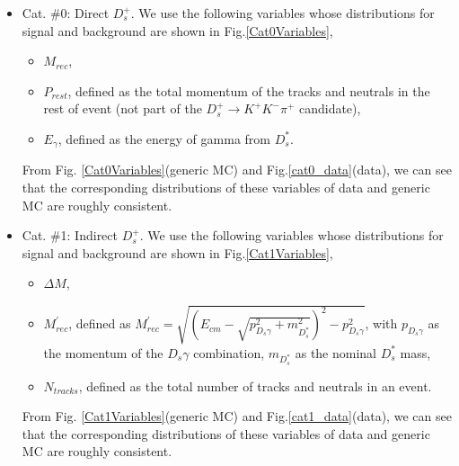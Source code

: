 \begin{itemize}
    \item Cat. \#0: Direct $D_{s}^{+}$. We use the following variables whose distributions for signal and background are shown in Fig.\ref{Cat0Variables},
        \begin{itemize}
            \item[1. ] $M_{rec}$,
            \item[2. ] $P_{rest}$, defined as the total momentum of the tracks and neutrals in the rest of event (not part of the $D_{s}^{+} \rightarrow K^{+}K^{-}\pi^{+}$ candidate),
            \item[3. ] $E_{\gamma}$, defined as the energy of gamma from $D_{s}^{*}$.
        \end{itemize}
        From Fig. \ref{Cat0Variables}(generic MC) and Fig.\ref{cat0_data}(data), we can see that the corresponding distributions of these variables of data and generic MC are roughly consistent.
        

    \item Cat. \#1: Indirect $D_{s}^{+}$.
        We use the following variables whose distributions for signal and background are shown in Fig.\ref{Cat1Variables},
        \begin{itemize}
            \item[1. ] $\Delta{M}$,
            \item[2. ] $M_{rec}^{'}$, defined as $M_{rec}^{'} = \sqrt{ {(E_{cm}  - \sqrt{p_{D_{s}\gamma}^{2} + m_{D_{s}^{*}}^{2}}) }^{2} - p_{D_{s}\gamma}^{2}}$, with $p_{D_{s}\gamma}$ as the momentum of the $D_{s}\gamma$ combination, $m_{D_{s}^{*}}$ as the nominal ${D_{s}^{*}}$ mass,
            \item[3. ] $N_{tracks}$, defined as the total number of tracks and neutrals in an event.
        \end{itemize}
        From Fig. \ref{Cat1Variables}(generic MC) and Fig.\ref{cat1_data}(data), we can see that the corresponding distributions of these variables of data and generic MC are roughly consistent.
\end{itemize}




